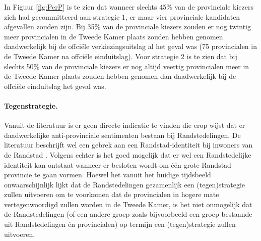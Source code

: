 In Figuur \ref{fig:PerP} is te zien dat wanneer slechts 45\% van de provinciale kiezers zich had gecommitteerd aan strategie 1, er maar vier provinciale kandidaten afgevallen zouden zijn. Bij 35\% van de provinciale kiezers zouden er nog twintig meer provincialen in de Tweede Kamer plaats zouden hebben genomen daadwerkelijk bij de offci\"{e}le verkiezingsuitslag al het geval was (75 provincialen in de Tweede Kamer na offci\"{e}le einduitslag). Voor strategie 2 is te zien dat bij slechts 50\% van de provinciale kiezers er nog altijd veertig provincialen meer in de Tweede Kamer plaats zouden hebben genomen dan daadwerkelijk bij de offci\"{e}le einduitslag het geval was.


 




\paragraph{Tegenstrategie.}
Vanuit de literatuur is er geen directe indicatie te vinden die erop wijst dat er daadwerkelijke anti-provinciale sentimenten bestaan bij Randstedelingen. De literatuur beschrijft wel een gebrek aan een Randstad-identiteit bij inwoners van de Randstad \citep{meijers2001deltametropool,terlouw2010randstad}. Volgens \cite{terlouw2010randstad} echter is het goed mogelijk dat er wel een Randstedelijke identiteit kan ontstaat wanneer er besloten wordt om één grote Randstad-provincie te gaan vormen. Hoewel het vanuit het huidige tijdsbeeld onwaarschijnlijk lijkt dat de Randstedelingen gezamenlijk een (tegen)strategie zullen uitvoeren om te voorkomen dat de provincialen in hogere mate vertegenwoordigd zullen worden in de Tweede Kamer, is het niet onmogelijk dat de Randstedelingen (of een andere groep zoals bijvoorbeeld een groep bestaande uit Randstedelingen én provincialen) op termijn een (tegen)strategie zullen uitvoeren. 


